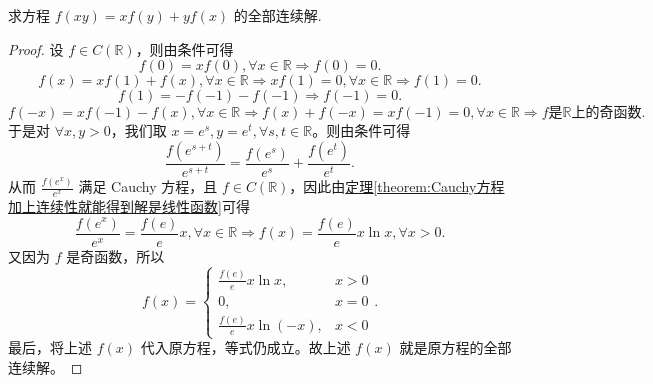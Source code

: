 \documentclass[../../main.tex]{subfiles}
\begin{document}
\begin{example}
求方程 \(f(xy)=xf(y)+yf(x)\) 的全部连续解.
\end{example}
\begin{proof}
设 \(f\in C(\mathbb{R})\)，则由条件可得
\[
f(0)=xf(0),\forall x\in \mathbb{R}\Rightarrow f(0)=0.
\]
\[
f(x)=xf(1)+f(x),\forall x\in \mathbb{R}\Rightarrow xf(1)=0,\forall x\in \mathbb{R}\Rightarrow f(1)=0.
\]
\[
f(1)=-f(-1)-f(-1)\Rightarrow f(-1)=0.
\]
\[
f(-x)=xf(-1)-f(x),\forall x\in \mathbb{R}\Rightarrow f(x)+f(-x)=xf(-1)=0,\forall x\in \mathbb{R}
\Rightarrow f\text{是}\mathbb{R}\text{上的奇函数}.
\]
于是对 \(\forall x,y > 0\)，我们取 \(x = e^s,y = e^t,\forall s,t\in \mathbb{R}\)。则由条件可得
\[
\frac{f(e^{s + t})}{e^{s + t}}=\frac{f(e^s)}{e^s}+\frac{f(e^t)}{e^t}.
\]
从而 \(\frac{f(e^x)}{e^x}\) 满足 Cauchy 方程，且 \(f\in C(\mathbb{R})\)，因此由\hyperref[theorem:Cauchy方程加上连续性就能得到解是线性函数]{定理\ref{theorem:Cauchy方程加上连续性就能得到解是线性函数}}可得
\[
\frac{f(e^x)}{e^x}=\frac{f(e)}{e}x,\forall x\in \mathbb{R}\Rightarrow f(x)=\frac{f(e)}{e}x\ln x,\forall x > 0.
\]
又因为 \(f\) 是奇函数，所以
\[
f(x)=\begin{cases}
\frac{f(e)}{e}x\ln x, & x > 0\\
0, & x = 0\\
\frac{f(e)}{e}x\ln(-x), & x < 0
\end{cases}.
\]
最后，将上述 \(f(x)\) 代入原方程，等式仍成立。故上述 \(f(x)\) 就是原方程的全部连续解。
\end{proof}
\end{document}
